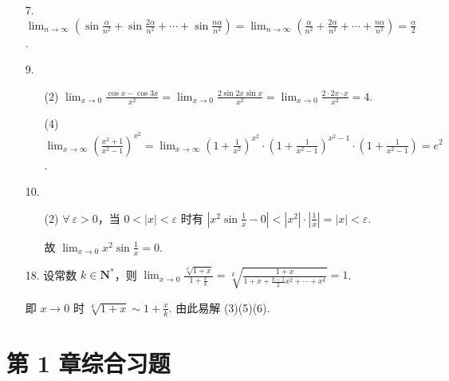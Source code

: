 \documentclass[oneside]{ctexbook} %
\begin{document}
\begin{enumerate}
    \item[7.]
    $\displaystyle\lim_{n \to \infty} \left( \sin\frac \alpha {n^2} + \sin\frac{2\alpha}{n^2} + \cdots + \sin\frac{n\alpha}{n^2} \right) = \lim_{n \to \infty} \left( \frac \alpha {n^2} + \frac{2\alpha}{n^2} + \cdots + \frac{n\alpha}{n^2} \right) = \frac \alpha 2$.
    \item[9.]
    \begin{enumerate}
        \item[(2)]
        $\displaystyle\lim_{x \to 0} \frac{\cos x-\cos 3x}{x^2} = \lim_{x \to 0} \frac{2\sin 2x\sin x}{x^2} = \lim_{x \to 0} \frac {2 \cdot 2x \cdot x}{x^2} = 4$.
        \item[(4)]
        $\displaystyle\lim_{x \to \infty} \left(\frac{x^2+1}{x^2-1}\right)^{x^2} = \lim_{x \to \infty} \left(1+\frac 1 {x^2}\right)^{x^2} \cdot \left(1+\frac 1 {x^2-1}\right)^{x^2-1} \cdot \left(1+\frac 1 {x^2-1}\right) = e^2$.
    \end{enumerate}
    \item[10.]
    \begin{enumerate}
        \item[(2)]
        $\forall \ \varepsilon > 0$，当 $0 < |x| < \varepsilon$ 时有 $\left|x^2 \sin \frac 1 x - 0\right| < |x^2| \cdot \left| \frac 1 x \right| = |x| < \varepsilon$.
        
        故 $\displaystyle \lim_{x \to 0} x^2 \sin \frac 1 x = 0$.
    \end{enumerate}
    \item[18.]
    设常数 $k \in \mathbf{N^*}$，则 $\displaystyle\lim_{x \to 0} \frac{\sqrt[k]{1+x}}{1+\frac x k} = \sqrt[k]{\frac{1+x}{1+x+\frac {k-1} 2 x^2+\cdots+x^k}} = 1$.
    
    即 $x \to 0$ 时 $\sqrt[k]{1+x} \sim 1 + \frac x k$. 由此易解 (3)(5)(6).
\end{enumerate}

\section*{第 1 章综合习题}
\end{document}
